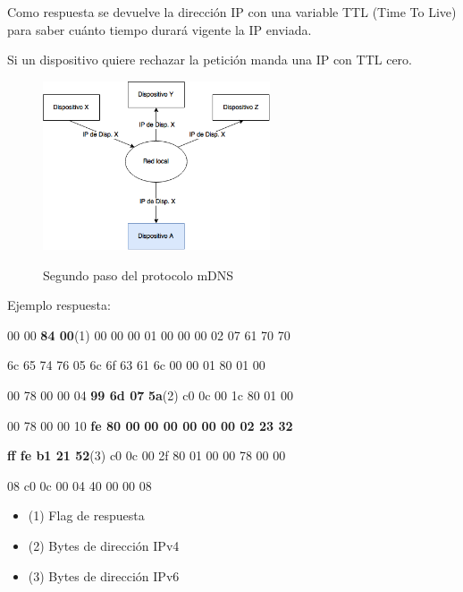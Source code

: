 Como respuesta se devuelve la dirección IP con una variable TTL (Time To Live) para saber cuánto tiempo durará vigente la IP enviada.

Si un dispositivo quiere rechazar la petición manda una IP con TTL cero.

\begin{figure}[H]
	\centering
	\includegraphics[width=0.6\textwidth]{./Imagenes/mdns2.png}
	\label{fig:mdns2}
	\caption{Segundo paso del protocolo mDNS}
\end{figure}


	Ejemplo respuesta:

	00 00 \textbf{84 00}(1) 00 00 00 01 \hspace{0.1cm} 00 00 00 02 07 61 70 70
	
	6c 65 74 76 05 6c 6f 63 \hspace{0.1cm} 61 6c 00 00 01 80 01 00
	
	00 78 00 00 04 \textbf{99 6d 07} \hspace{0.1cm} \textbf{5a}(2) c0 0c 00 1c 80 01 00
	
	00 78 00 00 10 \textbf{fe 80 00} \hspace{0.1cm} \textbf{00 00 00 00 00 02 23 32}
	
	\textbf{ff fe b1 21 52}(3) c0 0c 00 \hspace{0.1cm} 2f 80 01 00 00 78 00 00
	
	08 c0 0c 00 04 40 00 00 \hspace{0.1cm} 08

	
\begin{itemize}
	\item (1) Flag de respuesta
	\item (2) Bytes de dirección IPv4
	\item (3) Bytes de dirección IPv6
\end{itemize}
